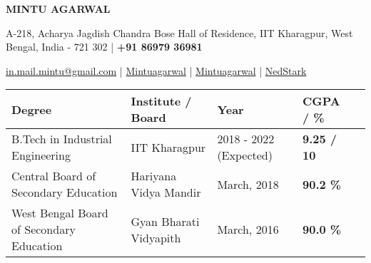 \documentclass[10pt]{article}
\begin{document}
\begin{center}
    {\Huge \textbf{MINTU AGARWAL}}\\[0.7ex]
\end{center}
\vspace{-3.5ex}
\begin{center}
    {\small A-218, Acharya Jagdish Chandra Bose Hall of Residence, IIT Kharagpur, West Bengal, India - 721 302 | \faMobile\hspace{0.2ex} \textbf{+91 86979 36981} }
\end{center}
\vspace{-3.8ex}
\begin{center}
    \Letter\hspace{0.2ex}
    \href{mailto:in.mail.mintu@gmail.com}{\small in.mail.mintu@gmail.com} |
    \faLinkedinSquare\hspace{0.2ex}     \href{https://www.linkedin.com/in/mintuagarwal/}{\small Mintuagarwal} | 
    \faGithub\hspace{0.2ex} \href{https://github.com/Mintuagarwal}{\small Mintuagarwal} |
    \faCode\hspace{0.2ex}     \href{https://www.stopstalk.com/user/profile/Ned_Stark}{\small Ned\textunderscore Stark} 
\end{center}

\vspace{-3.0ex}
\spacedhrule{0.2ex}{2.0ex}
\vspace{-1ex}
\renewcommand{\arraystretch}{1.5}
\indent \begin{tabular}{ |@{\hskip 0.125in}l @{\hskip 0.125in} |@{\hskip 0.125in}l @{\hskip 0.125in} |@{\hskip 0.125in}l @{\hskip 0.125in} |@{\hskip 0.125in}l @{\hskip 0.125in} |l }
\hline \textbf{Degree} & \textbf{Institute / Board} & \textbf{Year} & \textbf{CGPA / \%} \\ 
\hline {B.Tech in Industrial Engineering} & IIT Kharagpur  & 2018 - 2022 (Expected) & \textbf{9.25 / 10} \iffalse \href{https://github.com/harsh639/Credentials/tree/master/Academics}  {\hspace{1.0ex}\faMousePointer}\fi \\
\hline Central Board of Secondary Education & Hariyana Vidya Mandir & March, 2018 & \textbf{90.2 \%} \iffalse \href{https://github.com/harsh639/Credentials/tree/master/Academics} {\hspace{2.5ex}\faMousePointer} \fi \\
\hline West Bengal Board of {Secondary} Education & Gyan Bharati Vidyapith & March, 2016 & \textbf{90.0 \%} \iffalse \href{https://github.com/harsh639/Credentials/tree/master/Academics} {\hspace{2.3ex}\faMousePointer} \fi \\
\hline
\end{tabular}
\\
\end{document}
